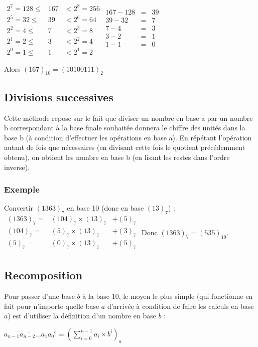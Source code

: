 \documentclass[a4paper,10pt]{book}
\begin{document}
\begin{center}
$\begin{array}{rcl} 2^{7}=128\leq &167&<2^{8}=256\\
2^{5}=32\leq &39&<2^{6}=64\\
2^{2}=4\leq &7&<2^{3}=8 \\
2^{1}=2\leq &3&<2^{2}=4 \\
2^{0}=1\leq &1&<2^{1}=2  \end{array}
\begin{array}{rcl}
167-128&=&39\\
39-32&=&7\\
7-4&=&3\\
3-2&=&1\\
1-1&=&0\\ \end{array}$ \end{center}

\begin{center} Alors $(167)_{10}=(10100111)_{2}$ \end{center}

\subsection{Divisions successives}
Cette méthode repose sur le fait que diviser un nombre en base a par un nombre b correspondant à la base finale souhaitée donnera le chiffre des unités dans la base b (à condition d'effectuer les opérations en base a). En répétant l'opération autant de fois que nécessaires (en divisant cette fois le quotient précédemment obtenu), on obtient les nombre en base b (en lisant les restes dans l'ordre inverse).

\subsubsection{Exemple}
Convertir $(1363)_{7}$ en base 10 (donc en base $(13)_{7}$) :\\

$\begin{array}{rcl} (1363)_{7}=&(104)_{7}\times (13)_{7}&+(5)_{7}\\
(104)_{7}=&(5)_{7}\times (13)_{7}&+(3)_{7}\\
(5)_{7}=&(0)_{7}\times (13)_{7}&+(5)_{7}\\\end{array}$
Donc $(1363)_{7}=(535)_{10}$.

\subsection{Recomposition}
Pour passer d'une base $b$ à la base 10, le moyen le plus simple (qui fonctionne en fait pour n'importe quelle base $a$ d'arrivée à condition de faire les calculs en base $a$) est d'utiliser la définition d'un nombre en base $b$ :
\begin{center} $\overline{a_{n-1}a_{n-2}...a_{1}a_{0}}^{b}=\left( \sum\limits_{i=0}^{n-1}a_{i}\times b^{i}\right)_{a}$ \end{center}
\end{document}
